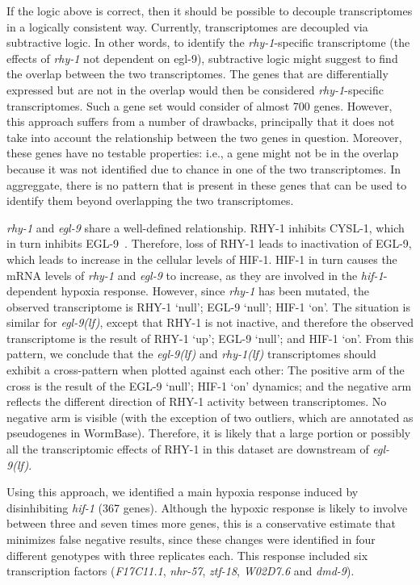 \documentclass[9pt,twocolumn,twoside]{pnas-new}
\newcommand{\gene}[1]{\emph{#1}}
\newcommand{\nhr}{\emph{nhr-57}}
\newcommand{\egl}{\emph{egl-9(lf)}}
\newcommand{\rhy}{\emph{rhy-1(lf)}}
\newcommand{\eglp}{EGL-9}
\newcommand{\rhyp}{RHY-1}
\newcommand{\hifp}{HIF-1}
\newcommand{\cyslp}{CYSL-1}
\begin{document}
If the logic above is correct, then it should be possible to decouple
transcriptomes in a logically consistent way. Currently, transcriptomes are
decoupled via subtractive logic. In other words, to identify the
\gene{rhy-1}-specific
transcriptome (the effects of \gene{rhy-1} not dependent on \gene{}egl-9),
subtractive logic
might suggest to find the overlap between the two transcriptomes. The genes that
are differentially expressed but are not in the overlap would then be considered
\gene{rhy-1}-specific transcriptomes. Such a gene set would consider of almost
700 genes. However, this approach suffers from a number of
drawbacks, principally that it does not take into account the relationship
between the two genes in question. Moreover, these genes have no testable properties:
i.e., a gene might not be in the overlap because it was not identified due to
chance in one of the two transcriptomes. In aggreggate, there is no pattern that
is present in these genes that can be used to identify them beyond overlapping
the two transcriptomes.

\gene{rhy-1} and \gene{egl-9} share a well-defined relationship. \rhyp{}
inhibits \cyslp{},
which in turn inhibits \eglp{}~\cite{Ma2012}. Therefore, loss of \rhyp{} leads
to inactivation of \eglp{}, which leads to increase in the cellular levels of
\hifp{}. \hifp{} in turn causes the mRNA levels of \gene{rhy-1} and \gene{egl-9}
to increase,
as they are involved in the \gene{hif-1}-dependent hypoxia response. However, since
\gene{rhy-1} has been mutated, the observed transcriptome is
\rhyp{} `null'; \eglp{} `null'; \hifp{} `on'. The situation is similar for
\egl{}, except that \rhyp{}
is not inactive, and therefore the observed transcriptome is the result of
\rhyp{} `up'; \eglp{} `null'; and \hifp{} `on'. From this pattern, we conclude that
the \egl{} and \rhy{} transcriptomes should exhibit a cross-pattern when plotted
against each other: The positive
arm of the cross is the result of the \eglp{} `null'; \hifp{} `on' dynamics; and the
negative arm reflects the different direction of \rhyp{} activity between
transcriptomes. No negative arm is visible (with the exception of two
outliers, which are annotated as pseudogenes in WormBase). Therefore, it is likely
that a large portion or possibly all the transcriptomic effects of \rhyp{} in
this dataset are downstream of \egl{}.

Using this approach, we identified a main hypoxia response induced by disinhibiting
\gene{hif-1} (367 genes). Although the hypoxic response is likely
to involve between three and seven times more genes, this is a conservative
estimate that minimizes false negative results, since these changes were
identified in four different genotypes with three replicates each. This response
included six transcription factors (\emph{F17C11.1}, \nhr{}, \gene{ztf-18},
\gene{W02D7.6} and \gene{dmd-9}).
\end{document}
